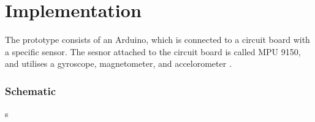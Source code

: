 \chapter{Implementation}

The prototype consists of an Arduino, which is connected to a circuit board with a specific sensor. 
The sesnor attached to the circuit board is called MPU 9150, and utilises a gyroscope, magnetometer, and accelorometer \citep{MPU}.

\subsection{Schematic}s 

\begin{minipage}{\linewidth}%
\label{schematic}
\end{minipage}\\